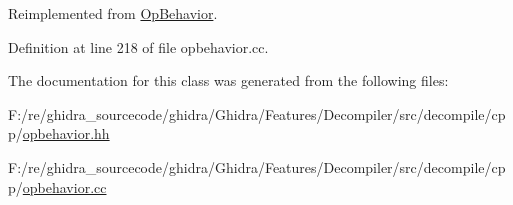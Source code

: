 Reimplemented from \mbox{\hyperlink{class_op_behavior_aeeed3af7aa35264b31a1f182884214a9}{Op\+Behavior}}.



Definition at line 218 of file opbehavior.\+cc.



The documentation for this class was generated from the following files\+:\begin{DoxyCompactItemize}
\item 
F\+:/re/ghidra\+\_\+sourcecode/ghidra/\+Ghidra/\+Features/\+Decompiler/src/decompile/cpp/\mbox{\hyperlink{opbehavior_8hh}{opbehavior.\+hh}}\item 
F\+:/re/ghidra\+\_\+sourcecode/ghidra/\+Ghidra/\+Features/\+Decompiler/src/decompile/cpp/\mbox{\hyperlink{opbehavior_8cc}{opbehavior.\+cc}}\end{DoxyCompactItemize}
